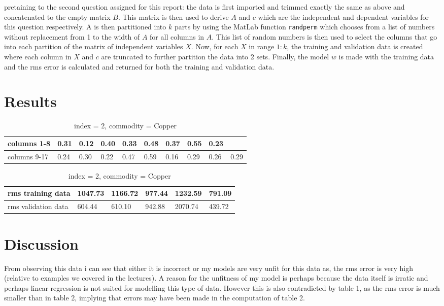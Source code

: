 \documentclass[12pt]{book}
\begin{document}
pretaining to the second question assigned for this report: the data is first imported and trimmed exactly the same as above and concatenated
        to the empty matrix $B$. This matrix is then used to derive  $A$ and  $c$ which are the independent and dependent variables for this
        question respectively. A is then partitioned into $k$ parts by using the MatLab function \texttt{randperm} which chooses from a 
        list of numbers without replacement from 1 to the width of $A$ for all columns in $A$. 
         This list of random numbers is then used to select the columns that go into each 
         partition of the matrix of independent variables $X$. 
         Now, for each $X$ in range  $1:k$, the training and validation data is created where each column in $X$ and  $c$ are truncated 
          to further partition the data into 2 sets.
          Finally, the model $w$ is made with the training data and the rms error is calculated and returned for both the training and 
          validation data.

\section*{Results}
\begin{table}[h]
        \centering
\begin{tabular}{@{}llllllllll@{}}
\toprule
\multicolumn{1}{l|}{columns 1-8}  & 0.31 & 0.12 & 0.40 & 0.33 & 0.48 & 0.37 & 0.55 & 0.23 &      \\ \midrule
\multicolumn{1}{l|}{columns 9-17} & 0.24 & 0.30 & 0.22 & 0.47 & 0.59 & 0.16 & 0.29 & 0.26 & 0.29 \\ \bottomrule

\end{tabular}
\caption{index = 2, commodity = Copper}
\end{table}

\begin{table}[h]
\centering
\begin{tabular}{@{}llllll@{}}
\toprule
rms training data   & 1047.73 & 1166.72 & 977.44 & 1232.59 & 791.09 \\ \midrule
rms validation data & 604.44  & 610.10  & 942.88 & 2070.74 & 439.72 \\ \bottomrule
\end{tabular}
\caption{index = 2, commodity = Copper}
\end{table}

\section*{Discussion}
From observing this data i can see that either it is incorrect or my models are very unfit for this data as, the rms error is very high
(relative to examples we covered in the lectures). A reason for the unfitness of my model is perhaps because the data itself is 
irratic and perhaps linear regression is not suited for modelling this type of data. However this is also contradicted by table 1, as
the rms error is much smaller than in table 2, implying that errors may have been made in the computation of table 2.
        
\end{document}
